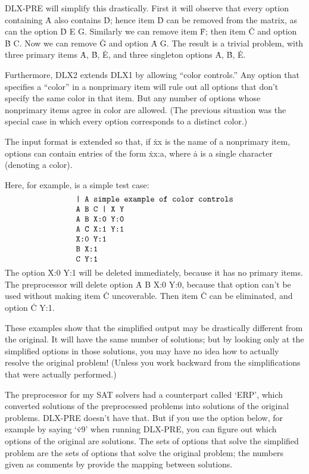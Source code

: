 {\mc DLX-PRE} will simplify this drastically. First it will observe
that every option containing \.A also contains \.D; hence item \.D can
be removed from the matrix, as can the option \.{D E G}. Similarly
we can remove item \.F; then item \.C and option \.{B C}.
Now we can remove \.G and option \.{A G}. The result is a trivial
problem, with three primary items \.A, \.B, \.E, and
three singleton options \.A, \.B, \.E.

\fi

Furthermore, {\mc DLX2} extends {\mc DLX1} by allowing ``color controls.''
Any option that specifies a ``color'' in a nonprimary item will rule out all
options that don't specify the same color in that item.
But any number of options whose
nonprimary items agree in color are allowed. (The previous
situation was the special case in which every option corresponds to a
distinct color.)

The input format is extended so that, if \.{xx} is the name of a nonprimary
item, options can contain entries of the form \.{xx:a}, where \.a is
a single character (denoting a color).

Here, for example, is a simple test case:
$$
\vcenter{\halign{\tt#\cr
\char"7C\ A simple example of color controls\cr
A B C \char"7C\ X Y\cr
A B X:0 Y:0\cr
A C X:1 Y:1\cr
X:0 Y:1\cr
B X:1\cr
C Y:1\cr}}
$$
The option \.{X:0 Y:1} will be deleted immediately,
because it has no primary items.
The preprocessor will delete option \.{A B X:0 Y:0}, because that option
can't be used without making item \.C uncoverable.
Then item \.C can be eliminated, and option \.{C Y:1}.

\fi

These examples show that the simplified output may be drastically
different from the original. It will have the same number of solutions;
but by looking only at the simplified options in those solutions,
you may have no idea how to actually resolve the original
problem! (Unless you work backward from
the simplifications that were actually performed.)

The preprocessor for my {\mc SAT} solvers had a counterpart called
`{\mc ERP}', which converted solutions of the preprocessed problems
into solutions of the original problems. {\mc DLX-PRE} doesn't
have that. But if you use the  option below,
for example by saying `\.{v9}' when running {\mc DLX-PRE}, you
can figure out which options of the original are solutions. The sets
of options that solve the simplified problem are the sets of options
that solve the original problem; the numbers given as comments
by  provide the mapping between solutions.

